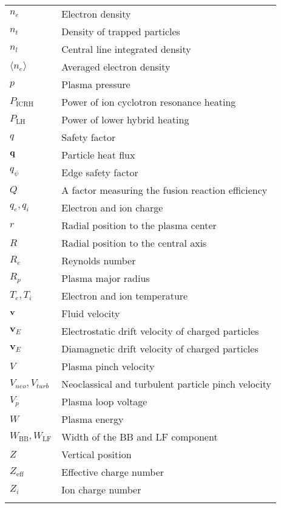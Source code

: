 \begin{longtable}{ll}
$n_e$& Electron density \\
$n_t$& Density of trapped particles \\
$n_l$& Central line integrated density \\
$\langle{n_e}\rangle$ & Averaged electron density \\
$p$ & Plasma pressure \\
$P_\mathrm{ICRH}$ & Power of ion cyclotron resonance heating \\
$P_\mathrm{LH}$ & Power of lower hybrid heating \\
$q$ & Safety factor \\
$\boldsymbol{\mathrm{q}}$ & Particle heat flux \\
$q_{\psi}$ & Edge safety factor \\
$Q$ & A factor measuring the fusion reaction efficiency \\
$q_e, q_i$ & Electron and ion charge \\
$r$ & Radial position to the plasma center \\
$R$ & Radial position to the central axis \\
$R_e$ & Reynolds number \\
$R_p$ & Plasma major radius \\
$T_e, T_i$ & Electron and ion temperature \\
$\boldsymbol{\mathrm{v}}$ & Fluid velocity \\
$\boldsymbol{v}_E$ & Electrostatic drift velocity of charged particles \\
$\boldsymbol{v}_E$ & Diamagnetic drift velocity of charged particles \\
$V$ & Plasma pinch velocity \\
$V_{neo}, V_{turb}$ & Neoclassical and turbulent particle pinch velocity \\
$V_p$ & Plasma loop voltage \\
$W$ & Plasma energy \\
$W_\mathrm{BB}, W_\mathrm{LF}$ & Width of the BB and LF component  \\
$Z$ & Vertical position \\
$Z_\mathrm{eff}$ & Effective charge number \\
$Z_i$ & Ion charge number \\

\null & \null \\


\end{longtable}
